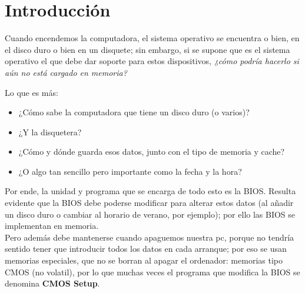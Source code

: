 \section{Introducción}\label{sec:introduccion}

Cuando encendemos la computadora, el sistema operativo se encuentra o bien, en
el disco duro o bien en un disquete; sin embargo, si se supone que es el
sistema operativo el que debe dar soporte para estos dispositivos, {\em ¿cómo podría
hacerlo si aún no está cargado en memoria?}

Lo que es más:
\begin{itemize}
	\item ¿Cómo sabe la computadora que tiene un disco duro (o varios)?
	\item ¿Y la disquetera?  
	\item ¿Cómo y dónde guarda esos datos, junto con el tipo de memoria y cache?
	\item ¿O algo tan sencillo pero importante como la fecha y la hora? 
\end{itemize}

Por ende, la unidad y programa que se encarga de todo esto es la BIOS.
Resulta evidente que la BIOS debe poderse modificar para alterar estos datos
(al añadir un disco duro o cambiar al horario de verano, por ejemplo); por ello
las BIOS se implementan en memoria. \\
Pero además debe mantenerse cuando apaguemos nuestra pc, porque no tendría
sentido tener que introducir todos los datos en cada arranque; por eso se usan
memorias especiales, que no se borran al apagar el ordenador: memorias tipo
CMOS (no volatil), por lo que muchas veces el programa que modifica la BIOS se
denomina {\bf CMOS Setup}.

\newpage
